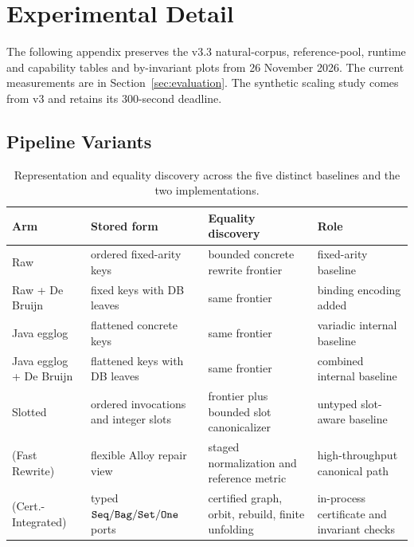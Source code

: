 \section{Experimental Detail}
\label{app:evaluation-detail}

The following appendix preserves the v3.3 natural-corpus, reference-pool,
runtime and capability tables and by-invariant plots from 26 November 2026.
The current measurements are in Section~\ref{sec:evaluation}. The synthetic
scaling study comes from v3 and retains its 300-second deadline.

\subsection{Pipeline Variants}

\begin{table}[H]
\caption{Representation and equality discovery across the five distinct
baselines and the two \CanDis{} implementations.}
\label{tab:engine-boundary}
\centering
\scriptsize
\setlength{\tabcolsep}{3pt}
\begin{tabular}{@{}%
>{\raggedright\arraybackslash}p{2.45cm}%
>{\raggedright\arraybackslash}p{2.7cm}%
>{\raggedright\arraybackslash}p{3.05cm}%
>{\raggedright\arraybackslash}p{3.25cm}@{}}
\toprule
Arm & Stored form & Equality discovery & Role\\
\midrule
Raw & ordered fixed-arity keys & bounded concrete rewrite frontier & fixed-arity baseline\\
Raw + De Bruijn & fixed keys with DB leaves & same frontier & binding encoding added\\
Java egglog & flattened concrete keys & same frontier & variadic internal baseline\\
Java egglog + De Bruijn & flattened keys with DB leaves & same frontier & combined internal baseline\\
Slotted & ordered invocations and integer slots & frontier plus bounded slot canonicalizer & untyped slot-aware baseline\\
\CanDis{} (Fast Rewrite) & flexible Alloy repair view & staged normalization and reference metric & high-throughput canonical path\\
\CanDis{} (Cert.-Integrated) & typed $\texttt{Seq}/\texttt{Bag}/\texttt{Set}/\texttt{One}$ ports & certified graph, orbit, rebuild, finite unfolding & in-process certificate and invariant checks\\
\bottomrule
\end{tabular}
\end{table}

